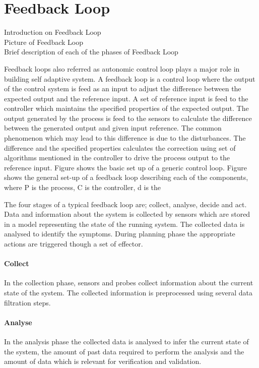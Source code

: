 \section{Feedback Loop}



Introduction on Feedback Loop\\
Picture of Feedback Loop\\
Brief description of each of the phases of Feedback Loop

Feedback loops also referred as autonomic control loop plays a major role in building self adaptive system. A feedback loop is a control loop where the output of the control system is feed as an input to adjust the difference between the expected output and the reference input. A set of reference input is feed to the controller which maintains the specified properties of the expected output. The output generated by the process is feed to the sensors to calculate the difference between the generated output and given input reference. The common phenomenon which may lead to this difference is due to the disturbances. The difference and the specified properties calculates the correction using set of algorithms mentioned in the controller to drive the process output to the reference input. Figure shows the basic set up of a generic control loop. Figure shows the general set-up of a feedback loop describing each of the components, where P is the process, C is the controller, d is the  


The four stages of a typical feedback loop are; collect, analyse, decide and act. Data and information about the system is collected by sensors which are stored in a model representing the state of the running system. The collected data is analysed to identify the symptoms. During planning phase the appropriate actions are triggered though a set of effector.

\paragraph*{Collect}
In the collection phase, sensors and probes collect information about the current state
of the system. The collected information is preprocessed using several data filtration steps.    

\paragraph*{Analyse}
In the analysis phase the collected data is analysed to infer the current state of the system, the amount of past data required to perform the analysis and the amount of data which is relevant for verification and validation.



